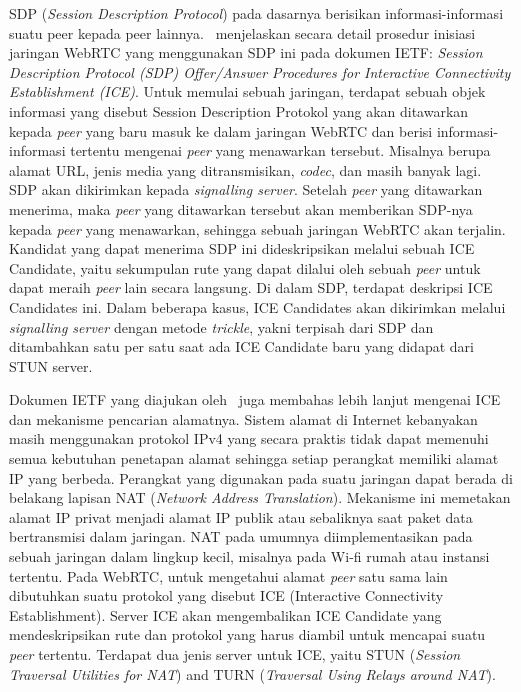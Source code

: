 SDP (\textit{Session Description Protocol}) pada dasarnya berisikan informasi-informasi suatu peer kepada peer lainnya.~\cite{rfc8839} menjelaskan secara detail prosedur inisiasi jaringan WebRTC yang menggunakan SDP ini pada dokumen IETF: \textit{Session Description Protocol (SDP) Offer/Answer Procedures for Interactive Connectivity Establishment (ICE)}. Untuk memulai sebuah jaringan, terdapat sebuah objek informasi yang disebut Session Description Protokol yang akan ditawarkan kepada \textit{peer} yang baru masuk ke dalam jaringan WebRTC dan berisi informasi-informasi tertentu mengenai \textit{peer} yang menawarkan tersebut. Misalnya berupa alamat URL, jenis media yang ditransmisikan, \textit{codec}, dan masih banyak lagi. SDP akan dikirimkan kepada \textit{signalling server}. Setelah \textit{peer} yang ditawarkan menerima, maka \textit{peer} yang ditawarkan tersebut akan memberikan SDP-nya kepada \textit{peer} yang menawarkan, sehingga sebuah jaringan WebRTC akan terjalin. Kandidat yang dapat menerima SDP ini dideskripsikan melalui sebuah ICE Candidate, yaitu sekumpulan rute yang dapat dilalui oleh sebuah \textit{peer} untuk dapat meraih \textit{peer} lain secara langsung. Di dalam SDP, terdapat deskripsi ICE Candidates ini. Dalam beberapa kasus, ICE Candidates akan dikirimkan melalui \textit{signalling server} dengan metode \textit{trickle}, yakni terpisah dari SDP dan ditambahkan satu per satu saat ada ICE Candidate baru yang didapat dari STUN server.

Dokumen IETF yang diajukan oleh~\cite{rfc8839} juga membahas lebih lanjut mengenai ICE dan mekanisme pencarian alamatnya. Sistem alamat di Internet kebanyakan masih menggunakan protokol IPv4 yang secara praktis tidak dapat memenuhi semua kebutuhan penetapan alamat sehingga setiap perangkat memiliki alamat IP yang berbeda. Perangkat yang digunakan pada suatu jaringan dapat berada di belakang lapisan NAT (\textit{Network Address Translation}). Mekanisme ini memetakan alamat IP privat menjadi alamat IP publik atau sebaliknya saat paket data bertransmisi dalam jaringan. NAT pada umumnya diimplementasikan pada sebuah jaringan dalam lingkup kecil, misalnya pada Wi-fi rumah atau instansi tertentu. Pada WebRTC, untuk mengetahui alamat \textit{peer} satu sama lain dibutuhkan suatu protokol yang disebut ICE (Interactive Connectivity Establishment). Server ICE akan mengembalikan ICE Candidate yang mendeskripsikan rute dan protokol yang harus diambil untuk mencapai suatu \textit{peer} tertentu. Terdapat dua jenis server untuk ICE, yaitu STUN (\textit{Session Traversal Utilities for NAT}) and TURN (\textit{Traversal Using Relays around NAT}).

